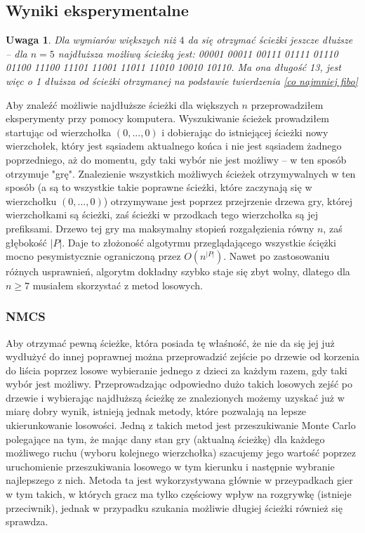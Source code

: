 \documentclass{pracamgr}
\newtheorem{remark}[theorem]{Uwaga}
\begin{document}
   \subsection{Wyniki eksperymentalne}
    \begin{remark}\label{da sie dluzsze}
     Dla wymiarów większych niż $4$ da się otrzymać ścieżki jeszcze dłuższe -- dla $n=5$ najdłuższa możliwą ścieżką jest:
     00001
     00011
     00111
     01111
     01110
     01100
     11100
     11101
     11001
     11011
     11010
     10010
     10110.\newline
     Ma ona długość 13, jest więc o 1 dłuższa od ścieżki otrzymanej na podstawie twierdzenia \ref{co najmniej fibo}
    \end{remark}
    Aby znaleźć możliwie najdłuższe ścieżki dla większych $n$ przeprowadziłem eksperymenty przy pomocy komputera.
    Wyszukiwanie ścieżek prowadziłem startując od wierzchołka $(0,...,0)$ i dobierając do istniejącej ścieżki nowy wierzchołek,
    który jest sąsiadem aktualnego końca i nie jest sąsiadem żadnego poprzedniego, aż do momentu, gdy taki wybór nie jest możliwy 
    -- w ten sposób otrzymuje "grę". Znalezienie wszystkich możliwych ścieżek otrzymywalnych w ten sposób
    (a są to wszystkie takie poprawne ścieżki, które zaczynają się w wierzchołku $(0,...,0)$) otrzymywane jest poprzez przejrzenie
    drzewa gry, której wierzchołkami są ścieżki, zaś ścieżki w przodkach tego wierzchołka są jej prefiksami.
    Drzewo tej gry ma maksymalny stopień rozgałęzienia równy $n$, zaś głębokość $|P|$.\newline
    Daje to złożoność algotyrmu przeglądającego wszystkie ściężki mocno pesymistycznie ograniczoną przez $O(n^{|P|})$. Nawet po zastosowaniu
    różnych usprawnień, algorytm dokładny szybko staje się zbyt wolny, dlatego dla $n\ge7$ musiałem skorzystać z metod losowych.
    \subsubsection{NMCS}
     Aby otrzymać pewną ścieżke, która posiada tę właśność, że nie da się jej już wydłużyć do innej poprawnej można przeprowadzić zejście po drzewie
     od korzenia do liścia poprzez losowe wybieranie jednego z dzieci za każdym razem, gdy taki wybór jest możliwy.\newline
     Przeprowadzając odpowiedno dużo takich losowych zejść po drzewie i wybierając najdłuższą ścieżkę ze znalezionych możemy uzyskać już w miarę dobry
     wynik, istnieją jednak metody, które pozwalają na lepsze ukierunkowanie losowości.\newline
     Jedną z takich metod jest przeszukiwanie Monte Carlo polegające na tym, że mając dany stan gry (aktualną ścieżkę) dla każdego możliwego ruchu
     (wyboru kolejnego wierzchołka) szacujemy jego wartość poprzez uruchomienie przeszukiwania losowego w tym kierunku i następnie wybranie najlepszego z nich.
     Metoda ta jest wykorzystywana głównie w przeypadkach gier w tym takich, w których gracz ma tylko częściowy wpływ na rozgrywkę (istnieje przeciwnik),
     jednak w przypadku szukania możliwie długiej ścieżki również się sprawdza.
     
\end{document}
